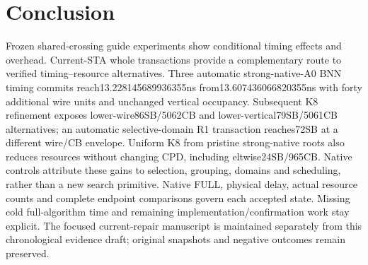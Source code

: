 \documentclass[conference,10pt]{IEEEtran}
\begin{document}
\section{Conclusion}
Frozen shared-crossing guide experiments show conditional timing effects and overhead. Current-STA whole transactions provide a complementary route to verified timing--resource alternatives. Three automatic strong-native-A0 BNN timing commits reach13.228145689936355ns from13.607436066820355ns with forty additional wire units and unchanged vertical occupancy. Subsequent K8 refinement exposes lower-wire86SB/5062CB and lower-vertical79SB/5061CB alternatives; an automatic selective-domain R1 transaction reaches72SB at a different wire/CB envelope. Uniform K8 from pristine strong-native roots also reduces resources without changing CPD, including eltwise24SB/965CB. Native controls attribute these gains to selection, grouping, domains and scheduling, rather than a new search primitive. Native FULL, physical delay, actual resource counts and complete endpoint comparisons govern each accepted state. Missing cold full-algorithm time and remaining implementation/confirmation work stay explicit. The focused current-repair manuscript is maintained separately from this chronological evidence draft; original snapshots and negative outcomes remain preserved.

\clearpage


\end{document}

